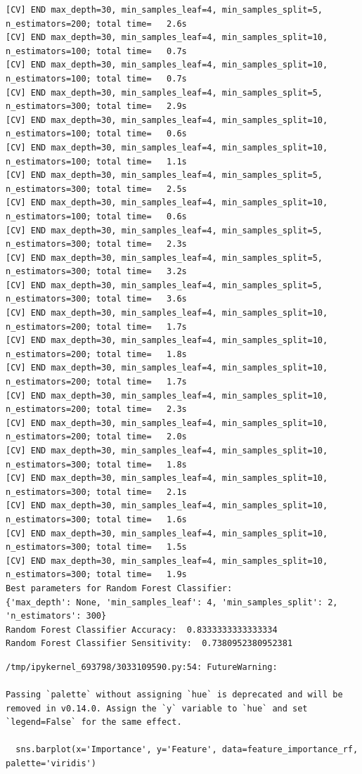 \documentclass[
  11pt,
  letterpaper,
  DIV=11,
  numbers=noendperiod]{scrartcl}
\begin{document}
\begin{verbatim}
[CV] END max_depth=30, min_samples_leaf=4, min_samples_split=5, n_estimators=200; total time=   2.6s
[CV] END max_depth=30, min_samples_leaf=4, min_samples_split=10, n_estimators=100; total time=   0.7s
[CV] END max_depth=30, min_samples_leaf=4, min_samples_split=10, n_estimators=100; total time=   0.7s
[CV] END max_depth=30, min_samples_leaf=4, min_samples_split=5, n_estimators=300; total time=   2.9s
[CV] END max_depth=30, min_samples_leaf=4, min_samples_split=10, n_estimators=100; total time=   0.6s
[CV] END max_depth=30, min_samples_leaf=4, min_samples_split=10, n_estimators=100; total time=   1.1s
[CV] END max_depth=30, min_samples_leaf=4, min_samples_split=5, n_estimators=300; total time=   2.5s
[CV] END max_depth=30, min_samples_leaf=4, min_samples_split=10, n_estimators=100; total time=   0.6s
[CV] END max_depth=30, min_samples_leaf=4, min_samples_split=5, n_estimators=300; total time=   2.3s
[CV] END max_depth=30, min_samples_leaf=4, min_samples_split=5, n_estimators=300; total time=   3.2s
[CV] END max_depth=30, min_samples_leaf=4, min_samples_split=5, n_estimators=300; total time=   3.6s
[CV] END max_depth=30, min_samples_leaf=4, min_samples_split=10, n_estimators=200; total time=   1.7s
[CV] END max_depth=30, min_samples_leaf=4, min_samples_split=10, n_estimators=200; total time=   1.8s
[CV] END max_depth=30, min_samples_leaf=4, min_samples_split=10, n_estimators=200; total time=   1.7s
[CV] END max_depth=30, min_samples_leaf=4, min_samples_split=10, n_estimators=200; total time=   2.3s
[CV] END max_depth=30, min_samples_leaf=4, min_samples_split=10, n_estimators=200; total time=   2.0s
[CV] END max_depth=30, min_samples_leaf=4, min_samples_split=10, n_estimators=300; total time=   1.8s
[CV] END max_depth=30, min_samples_leaf=4, min_samples_split=10, n_estimators=300; total time=   2.1s
[CV] END max_depth=30, min_samples_leaf=4, min_samples_split=10, n_estimators=300; total time=   1.6s
[CV] END max_depth=30, min_samples_leaf=4, min_samples_split=10, n_estimators=300; total time=   1.5s
[CV] END max_depth=30, min_samples_leaf=4, min_samples_split=10, n_estimators=300; total time=   1.9s
Best parameters for Random Forest Classifier:
{'max_depth': None, 'min_samples_leaf': 4, 'min_samples_split': 2, 'n_estimators': 300}
Random Forest Classifier Accuracy:  0.8333333333333334
Random Forest Classifier Sensitivity:  0.7380952380952381
\end{verbatim}

\begin{verbatim}
/tmp/ipykernel_693798/3033109590.py:54: FutureWarning: 

Passing `palette` without assigning `hue` is deprecated and will be removed in v0.14.0. Assign the `y` variable to `hue` and set `legend=False` for the same effect.

  sns.barplot(x='Importance', y='Feature', data=feature_importance_rf, palette='viridis')
\end{verbatim}
\end{document}
